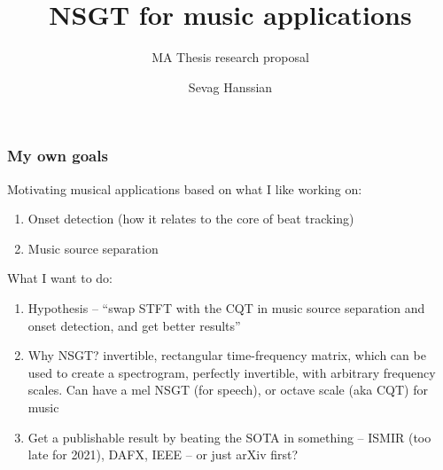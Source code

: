 \documentclass[usenames,dvipsnames]{beamer}
\title{NSGT for music applications}
\subtitle{MA Thesis research proposal}
\author{Sevag Hanssian}
\institute{DDMAL, McGill}
\begin{document}
\begin{frame}
\maketitle
\end{frame}

\begin{frame}
	\frametitle{My own goals}
	Motivating musical applications based on what I like working on:
	\begin{enumerate}
		\item
			Onset detection (how it relates to the core of beat tracking)
		\item
			Music source separation
	\end{enumerate}

	What I want to do:
	\begin{enumerate}
		\item
			Hypothesis -- ``swap STFT with the CQT in music source separation and onset detection, and get better results''
		\item
			Why NSGT? invertible, rectangular time-frequency matrix, which can be used to create a spectrogram, perfectly invertible, with arbitrary frequency scales. Can have a mel NSGT (for speech), or octave scale (aka CQT) for music
		\item
			Get a publishable result by beating the SOTA in something -- ISMIR (too late for 2021), DAFX, IEEE -- or just arXiv first?
	\end{enumerate}
\end{frame}
\end{document}
